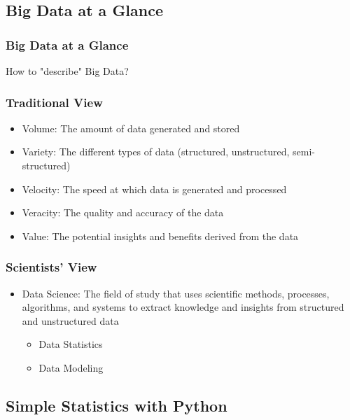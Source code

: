 \documentclass{beamer}
\begin{document}
    \subsection{Big Data at a Glance}
    \begin{frame}
        \frametitle{Big Data at a Glance}
        \begin{center}
            \Huge How to "describe" Big Data?
        \end{center}
    \end{frame}
    \begin{frame}
        \frametitle{Traditional View}
        \begin{itemize}
            \item Volume: The amount of data generated and stored
            \item Variety: The different types of data (structured, unstructured, semi-structured)
            \item Velocity: The speed at which data is generated and processed
            \item Veracity: The quality and accuracy of the data
            \item Value: The potential insights and benefits derived from the data
        \end{itemize}
    \end{frame}
    \begin{frame}
        \frametitle{Scientists' View}
        \begin{itemize}
            \item Data Science: The field of study that uses scientific methods, processes, algorithms, and systems to extract knowledge and insights from structured and unstructured data
            \begin{itemize}
                \item Data Statistics
                \item Data Modeling
            \end{itemize}
        \end{itemize}
    \end{frame}
    \subsection{Simple Statistics with Python}
\end{document}
